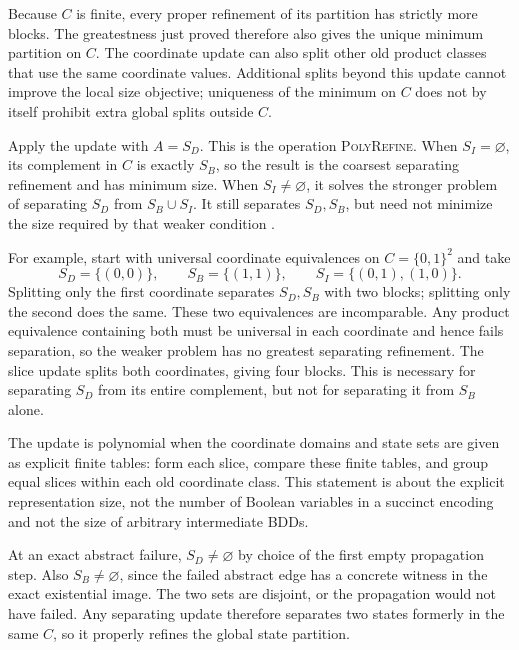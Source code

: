 Because \(C\) is finite, every proper refinement of its partition has
strictly more blocks. The greatestness just proved therefore also gives
the unique minimum partition on \(C\). The coordinate update can also
split other old product classes that use the same coordinate values.
Additional splits beyond this update cannot improve the local size
objective; uniqueness of the minimum on \(C\) does not by itself
prohibit extra global splits outside \(C\).

Apply the update with \(A=S_D\). This is the operation
\textsc{PolyRefine}. When \(S_I=\varnothing\), its complement in \(C\)
is exactly \(S_B\), so the result is the coarsest separating refinement
and has minimum size. When \(S_I\ne\varnothing\), it solves the
stronger problem of separating \(S_D\) from \(S_B\cup S_I\).
It still separates \(S_D,S_B\), but need not minimize the size required
by that weaker condition
\cite[lems.~4.18--4.19, cors.~4.20, 4.22, and rem.~4.23;
pp.~779--781]{ClarkeEtAl2003}.

For example, start with universal coordinate equivalences on
\(C=\{0,1\}^2\) and take
\[
 S_D=\{(0,0)\},\qquad S_B=\{(1,1)\},\qquad
 S_I=\{(0,1),(1,0)\}.
\]
Splitting only the first coordinate separates \(S_D,S_B\) with two
blocks; splitting only the second does the same. These two equivalences
are incomparable. Any product equivalence containing both must be
universal in each coordinate and hence fails separation, so the weaker
problem has no greatest separating refinement. The slice update splits
both coordinates, giving four blocks. This is necessary for separating
\(S_D\) from its entire complement, but not for separating it from
\(S_B\) alone.

The update is polynomial when the coordinate domains and state sets are
given as explicit finite tables: form each slice, compare these finite
tables, and group equal slices within each old coordinate class. This
statement is about the explicit representation size, not the number of
Boolean variables in a succinct encoding and not the size of arbitrary
intermediate BDDs.

At an exact abstract failure, \(S_D\ne\varnothing\) by choice of the
first empty propagation step. Also \(S_B\ne\varnothing\), since the
failed abstract edge has a concrete witness in the exact existential
image. The two sets are disjoint, or the propagation would not have
failed. Any separating update therefore separates two states formerly
in the same \(C\), so it properly refines the global state partition.

